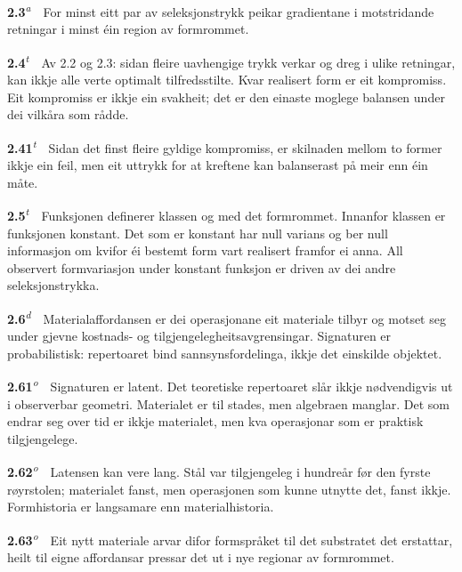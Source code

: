 \documentclass[10pt]{article}
\begin{document}
\noindent\textbf{2.3}\textsuperscript{\textit{a}}~~For minst eitt par av seleksjonstrykk peikar gradientane i motstridande retningar i minst éin region av formrommet.




\noindent\textbf{2.4}\textsuperscript{\textit{t}}~~Av 2.2 og 2.3: sidan fleire uavhengige trykk verkar og dreg i ulike retningar, kan ikkje alle verte optimalt tilfredsstilte. Kvar realisert form er eit kompromiss. Eit kompromiss er ikkje ein svakheit; det er den einaste moglege balansen under dei vilkåra som rådde.




\noindent\textbf{2.41}\textsuperscript{\textit{t}}~~Sidan det finst fleire gyldige kompromiss, er skilnaden mellom to former ikkje ein feil, men eit uttrykk for at kreftene kan balanserast på meir enn éin måte.




\noindent\textbf{2.5}\textsuperscript{\textit{t}}~~Funksjonen definerer klassen og med det formrommet. Innanfor klassen er funksjonen konstant. Det som er konstant har null varians og ber null informasjon om kvifor éi bestemt form vart realisert framfor ei anna. All observert formvariasjon under konstant funksjon er driven av dei andre seleksjonstrykka.




\noindent\textbf{2.6}\textsuperscript{\textit{d}}~~Materialaffordansen er dei operasjonane eit materiale tilbyr og motset seg under gjevne kostnads- og tilgjengelegheitsavgrensingar. Signaturen er probabilistisk: repertoaret bind sannsynsfordelinga, ikkje det einskilde objektet.




\noindent\textbf{2.61}\textsuperscript{\textit{o}}~~Signaturen er latent. Det teoretiske repertoaret slår ikkje nødvendigvis ut i observerbar geometri. Materialet er til stades, men algebraen manglar. Det som endrar seg over tid er ikkje materialet, men kva operasjonar som er praktisk tilgjengelege.




\noindent\textbf{2.62}\textsuperscript{\textit{o}}~~Latensen kan vere lang. Stål var tilgjengeleg i hundreår før den fyrste røyrstolen; materialet fanst, men operasjonen som kunne utnytte det, fanst ikkje. Formhistoria er langsamare enn materialhistoria.




\noindent\textbf{2.63}\textsuperscript{\textit{o}}~~Eit nytt materiale arvar difor formspråket til det substratet det erstattar, heilt til eigne affordansar pressar det ut i nye regionar av formrommet.
\end{document}
